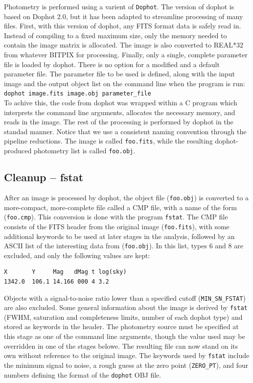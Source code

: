 \documentclass{article}
\begin{document}
Photometry is performed using a varient of {\tt Dophot}.  The version
of dophot is based on Dophot 2.0, but it has been adapted to
streamline processing of many files.  First, with this version of
dophot, any FITS format data is safely read in.  Instead of compiling
to a fixed maximum size, only the memory needed to contain the image
matrix is allocated.  The image is also converted to REAL*32 from
whatever BITPIX for processing.  Finally, only a single, complete
parameter file is loaded by dophot.  There is no option for a modified
and a default parameter file.  The parameter file to be used is
defined, along with the input image and the output object list on the
command line when the program is run: \\
{\tt dophot image.fits image.obj parameter\_file} \\
To achive this, the code from dophot was wrapped within a C program
which interprets the command line arguments, allocates the necessary
memory, and reads in the image.  The rest of the processing is
performed by dophot in the standad manner.  Notice that we use a
consistent naming convention through the pipeline reductions.  The
image is called {\tt foo.fits}, while the resulting dophot-produced
photometry list is called {\tt foo.obj}.  

\subsection{Cleanup -- fstat}

After an image is processed by dophot, the object file ({\tt foo.obj})
is converted to a more-compact, more-complete file called a CMP file,
with a name of the form ({\tt foo.cmp}).  This conversion is done with
the program {\tt fstat}.  The CMP file consists of the FITS header
from the original image ({\tt foo.fits}), with some additional
keywords to be used at later stages in the analysis, followed by an
ASCII list of the interesting data from ({\tt foo.obj}).  In this
list, types 6 and 8 are excluded, and only the following values are
kept:
\begin{verbatim}
X       Y     Mag   dMag t log(sky) 
1342.0  106.1 14.166 000 4 3.2
\end{verbatim}
Objects with a signal-to-noise ratio lower than a specified cutoff
({\tt MIN\_SN\_FSTAT}) are also excluded.  Some general information
about the image is derived by {\tt fstat} (FWHM, saturation and
completeness limits, number of each dophot type) and stored as
keywords in the header.  The photometry source must be specified at
this stage as one of the command line arguments, though the value used
may be overridden in one of the stages belowe.  The resulting file can
now stand on its own without reference to the original image.  The
keywords used by {\tt fstat} include the minimum signal to noise, a
rough guess at the zero point ({\tt ZERO\_PT}), and four numbers
defining the format of the {\tt dophot} OBJ file.
\end{document}
